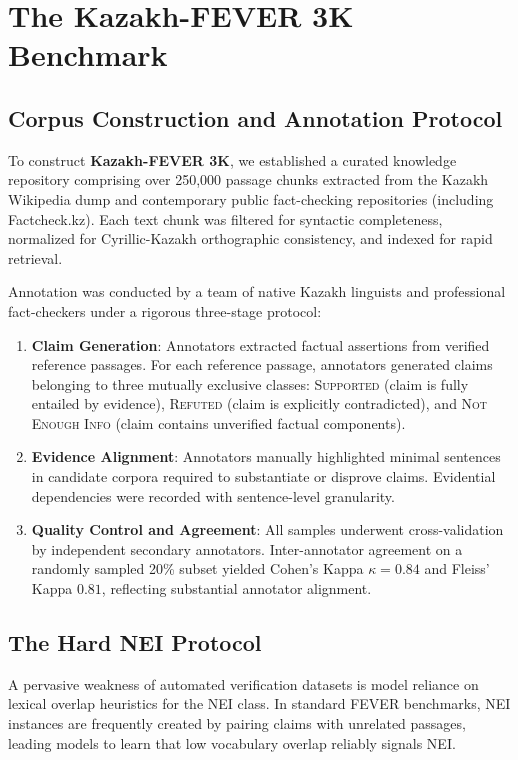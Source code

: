 \section{The Kazakh-FEVER 3K Benchmark}
\label{sec:benchmark}

\subsection{Corpus Construction and Annotation Protocol}
To construct \textbf{Kazakh-FEVER 3K}, we established a curated knowledge repository comprising over 250,000 passage chunks extracted from the Kazakh Wikipedia dump and contemporary public fact-checking repositories (including Factcheck.kz). Each text chunk was filtered for syntactic completeness, normalized for Cyrillic-Kazakh orthographic consistency, and indexed for rapid retrieval.

Annotation was conducted by a team of native Kazakh linguists and professional fact-checkers under a rigorous three-stage protocol:
\begin{enumerate}[leftmargin=*,nosep]
    \item \textbf{Claim Generation}: Annotators extracted factual assertions from verified reference passages. For each reference passage, annotators generated claims belonging to three mutually exclusive classes: \textsc{Supported} (claim is fully entailed by evidence), \textsc{Refuted} (claim is explicitly contradicted), and \textsc{Not Enough Info} (claim contains unverified factual components).
    \item \textbf{Evidence Alignment}: Annotators manually highlighted minimal sentences in candidate corpora required to substantiate or disprove claims. Evidential dependencies were recorded with sentence-level granularity.
    \item \textbf{Quality Control and Agreement}: All samples underwent cross-validation by independent secondary annotators. Inter-annotator agreement on a randomly sampled 20\% subset yielded Cohen's Kappa $\kappa = 0.84$ and Fleiss' Kappa $0.81$, reflecting substantial annotator alignment.
\end{enumerate}

\subsection{The Hard NEI Protocol}
A pervasive weakness of automated verification datasets is model reliance on lexical overlap heuristics for the \textsc{NEI} class. In standard FEVER benchmarks, NEI instances are frequently created by pairing claims with unrelated passages, leading models to learn that low vocabulary overlap reliably signals NEI.

